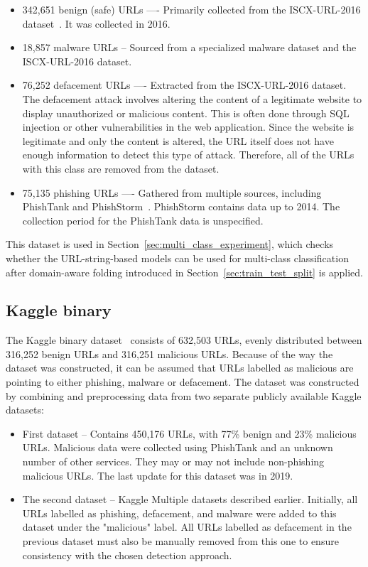 \begin{itemize}
    \item 342,651 benign (safe) URLs —- Primarily collected from the ISCX-URL-2016 dataset~\cite{ISCX-URL-2016}. It was collected in 2016.
    \item 18,857 malware URLs -- Sourced from a specialized malware dataset and the ISCX-URL-2016 dataset.
    \item 76,252 defacement URLs —- Extracted from the ISCX-URL-2016 dataset. The defacement attack \cite{wikipedia2024defacement} involves altering the content of a legitimate website to display unauthorized or malicious content. This is often done through SQL injection or other vulnerabilities in the web application. Since the website is legitimate and only the content is altered, the URL itself does not have enough information to detect this type of attack. Therefore, all of the URLs with this class are removed from the dataset.
    \item 75,135 phishing URLs —- Gathered from multiple sources, including PhishTank and PhishStorm~\cite{Marchal2014PhishStorm}. PhishStorm contains data up to 2014. The collection period for the PhishTank data is unspecified.
\end{itemize}

This dataset is used in Section~\ref{sec:multi_class_experiment}, which checks whether the URL-string-based models can be used for multi-class classification after domain-aware folding introduced in Section~\ref{sec:train_test_split} is applied.

\subsection{Kaggle binary}
The Kaggle binary dataset~\cite{KaggleBinaryDataset} consists of 632,503 URLs, evenly distributed between 316,252 benign URLs and 316,251 malicious URLs. Because of the way the dataset was constructed, it can be assumed that URLs labelled as malicious are pointing to either phishing, malware or defacement. The dataset was constructed by combining and preprocessing data from two separate publicly available Kaggle datasets:
\begin{itemize}
    \item First dataset -- Contains 450,176 URLs, with 77\% benign and 23\% malicious URLs. Malicious data were collected using PhishTank and an unknown number of other services. They may or may not include non-phishing malicious URLs. The last update for this dataset was in 2019.
    \item The second dataset -- Kaggle Multiple datasets described earlier. Initially, all URLs labelled as phishing, defacement, and malware were added to this dataset under the "malicious" label. All URLs labelled as defacement in the previous dataset must also be manually removed from this one to ensure consistency with the chosen detection approach.
\end{itemize}

